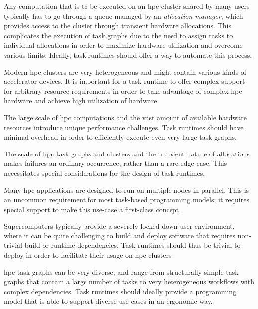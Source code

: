 \begin{description}[wide=0pt,itemsep=1pt,topsep=2pt]
	\item[Allocation manager] Any computation that is to be executed on an \gls{hpc} cluster shared by many users
		typically has to go through a queue managed by an \emph{allocation manager}, which provides access to
		the cluster through transient hardware allocations. This complicates the execution of task graphs
		due to the need to assign tasks to individual allocations in order to maximize hardware utilization
		and overcome various limits. Ideally, task runtimes should offer a way to automate this process.
	\item[Cluster heterogeneity] Modern \gls{hpc} clusters are very heterogeneous and might contain various kinds of
		accelerator devices. It is important for a task runtime to offer complex support for arbitrary
		resource requirements in order to take advantage of complex \gls{hpc} hardware and
		achieve high utilization of hardware.
	\item[Performance and scalability] The large scale of \gls{hpc} computations and the vast amount of available hardware
		resources introduce unique performance challenges. Task runtimes should have minimal overhead in
		order to efficiently execute even very large task graphs.
	\item[Fault tolerance] The scale of \gls{hpc} task graphs and clusters and the transient nature of allocations
		makes failures an ordinary occurrence, rather than a rare edge case. This necessitates special
		considerations for the design of task runtimes.
	\item[Multi-node tasks] Many \gls{hpc} applications are designed to run on multiple nodes in parallel. This is
		an uncommon requirement for most task-based programming models; it requires special support to make
		this use-case a first-class concept.
	\item[Deployment] Supercomputers typically provide a severely locked-down user environment, where it can be quite
		challenging to build and deploy software that requires non-trivial build or runtime dependencies.
		Task runtimes should thus be trivial to deploy in order to facilitate their usage on
		\gls{hpc} clusters.
	\item[Programming model] \gls{hpc} task graphs can be very diverse, and
		range from structurally simple task graphs that contain a large number of tasks to very
		heterogeneous workflows with complex dependencies. Task runtimes should ideally provide a
		programming model that is able to support diverse use-cases in an ergonomic way.
\end{description}


